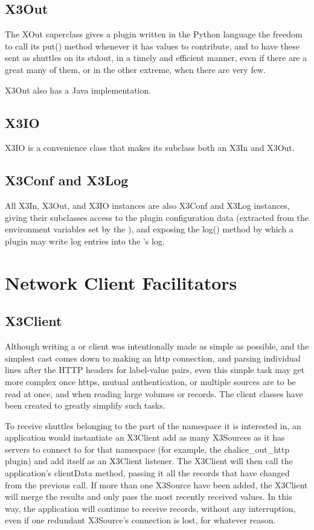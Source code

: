 \subsection{X3Out}

The XOut superclass gives a plugin written in the Python language the
freedom to call its put() method whenever it has values to contribute, and
to have these sent as shuttles on its stdout, in a timely and efficient
manner, even if there are a great many of them, or in the other extreme,
when there are very few.

X3Out also has a Java implementation.

\subsection{X3IO}

X3IO is a convenience class that makes its subclass both an X3In and
X3Out.

\subsection{X3Conf and X3Log}

All X3In, X3Out, and X3IO instances are also X3Conf and X3Log instances,
giving their subclasses access to the plugin configuration data
(extracted from the environment variables set by the \coven{}), and
exposing the log() method by which a plugin may write log entries into
the \coven{}'s log.

\section{Network Client Facilitators}
\subsection{X3Client}

Although writing a \rawproto{} or \diffproto{} client was intentionally
made as simple as possible, and the simplest cast comes down to making an
http connection, and parsing individual lines after the HTTP headers for
label-value pairs, even this simple task may get more complex once https,
mutual authentication, or multiple \diffproto{} sources are to be read
at once, and when reading large volumes or records.  The \diffproto{}
client classes have been created to greatly simplify such tasks.

To receive shuttles belonging to the part of the namespace it is
interested in, an application would instantiate an X3Client add as
many X3Sources as it has \diffproto{} servers to connect to for that
namespace (for example, the chalice\_out\_http plugin)
and add itself as an X3Client listener.  The X3Client will then call
the application's clientData method, passing it all the records that
have changed from the previous call. If more than one X3Source have
been added, the X3Client will merge the results and only pass the most
recently received values. In this way, the application will continue
to receive records, without any interruption, even if one redundant
X3Source's connection is lost, for whatever reason.


